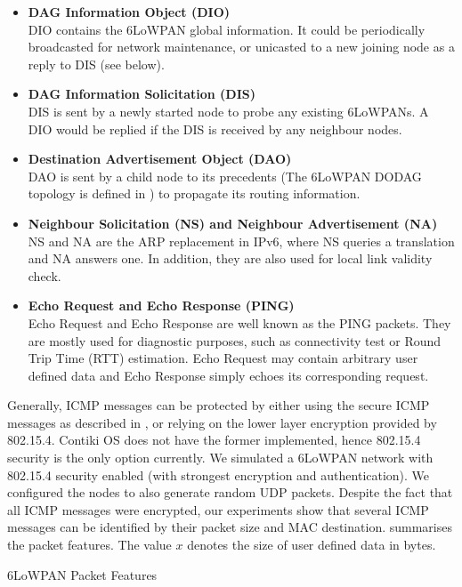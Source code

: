 \documentclass{article}
\begin{document}
\begin{itemize}
	\item \textbf{DAG Information Object (DIO)} \\
	DIO contains the 6LoWPAN global information. It could be periodically broadcasted for network maintenance, or unicasted to a new joining node as a reply to DIS (see below).
	\item \textbf{DAG Information Solicitation (DIS)} \\
	DIS is sent by a newly started node to probe any existing 6LoWPANs. A DIO would be replied if the DIS is received by any neighbour nodes.
	\item \textbf{Destination Advertisement Object (DAO)} \\
	DAO is sent by a child node to its precedents (The 6LoWPAN DODAG topology is defined in \cite{rfc6550}) to propagate its routing information.
	\item \textbf{Neighbour Solicitation (NS) and Neighbour Advertisement (NA)} \\
	NS and NA are the ARP replacement in IPv6, where NS queries a translation and NA answers one. In addition, they are also used for local link validity check.
	\item \textbf{Echo Request and Echo Response (PING)} \\
	Echo Request and Echo Response are well known as the PING packets. They are mostly used for diagnostic purposes, such as connectivity test or Round Trip Time (RTT) estimation. Echo Request may contain arbitrary user defined data and Echo Response simply echoes its corresponding request.
\end{itemize}

Generally, ICMP messages can be protected by either using the secure ICMP messages as described in \cite{rfc4443}, or relying on the lower layer encryption provided by 802.15.4. Contiki OS does not have the former implemented, hence 802.15.4 security is the only option currently. We simulated a 6LoWPAN network with 802.15.4 security enabled (with strongest encryption and authentication). We configured the nodes to also generate random UDP packets. Despite the fact that all ICMP messages were encrypted, our experiments show that several ICMP messages can be identified by their packet size and MAC destination.  summarises the packet features. The value $x$ denotes the size of user defined data in bytes.

\begin{table}
	\center
	
	\caption{6LoWPAN Packet Features\label{IcmpPacketFeature}}
\end{table}
\end{document}
